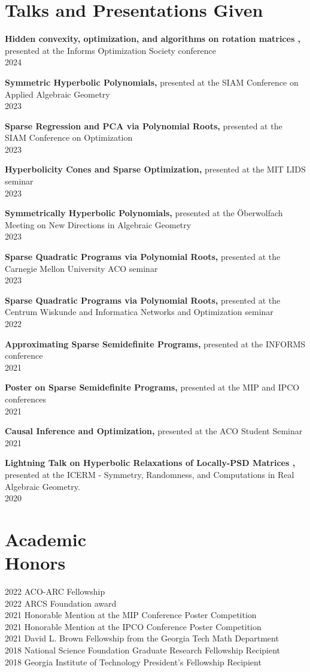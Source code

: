 \documentclass[margin]{res}
\begin{document}
\begin{resume}
\section{Talks and Presentations Given}
{\bf  Hidden convexity, optimization, and algorithms on rotation matrices  ,} presented at the Informs Optimization Society conference \\ 2024 

{\bf  Symmetric Hyperbolic Polynomials,} presented at the SIAM Conference on Applied Algebraic Geometry \\ 2023 

{\bf  Sparse Regression and PCA via Polynomial Roots,} presented at the SIAM Conference on Optimization \\ 2023 

{\bf  Hyperbolicity Cones and Sparse Optimization,} presented at the MIT LIDS seminar \\ 2023 

{\bf  Symmetrically Hyperbolic Polynomials,} presented at the \"Oberwolfach Meeting on New Directions in Algebraic Geometry \\ 2023 

{\bf  Sparse Quadratic Programs via Polynomial Roots,} presented at the Carnegie Mellon University ACO seminar \\ 2023 

{\bf  Sparse Quadratic Programs via Polynomial Roots,} presented at the Centrum Wiskunde and Informatica Networks and Optimization seminar \\ 2022 

{\bf  Approximating Sparse Semidefinite Programs,} presented at the INFORMS conference \\ 2021 

{\bf  Poster on Sparse Semidefinite Programs,} presented at the MIP and IPCO conferences \\ 2021 

{\bf  Causal Inference and Optimization,} presented at the ACO Student Seminar \\ 2021

{\bf  Lightning Talk on Hyperbolic Relaxations of Locally-PSD Matrices ,} presented at the ICERM - Symmetry, Randomness, and Computations in Real Algebraic Geometry.
 \\ 2020



\section{Academic \\ Honors} 
2022 ACO-ARC Fellowship\\
2022 ARCS Foundation award\\
2021 Honorable Mention at the MIP Conference Poster Competition\\
2021 Honorable Mention at the IPCO Conference Poster Competition\\
2021 David L. Brown Fellowship from the Georgia Tech Math Department\\
2018 National Science Foundation Graduate Research Fellowship Recipient\\
2018 Georgia Institute of Technology President's Fellowship Recipient


\end{resume}
\end{document}
